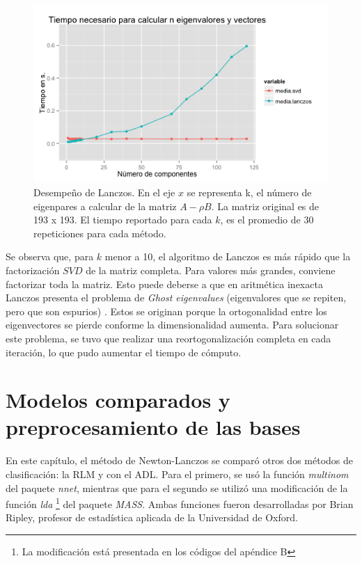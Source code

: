 \begin{figure}[!ht] \label{fig5.1}
  \centering
  \includegraphics[width=1\textwidth]{Figures/Chapter4_eigen_lanczos.png} 
  \caption[Desempeño de Lanczos.] {Desempeño de Lanczos. En el eje $x$ se representa k, el número de eigenpares a calcular de la matriz $A- \rho B$. La matriz original es de 193 x 193. El tiempo reportado para cada $k$, es el promedio de $30$ repeticiones para cada método.}
\end{figure}

Se observa que, para $k$ menor a 10, el algoritmo de Lanczos es más rápido que la factorización $SVD$ de la matriz completa. Para valores más grandes, conviene factorizar toda la matriz. Esto puede deberse a que en aritmética inexacta Lanczos presenta el problema de \textit{Ghost eigenvalues} (eigenvalores que se repiten, pero que son espurios) \cite{golub2012matrix}. Estos se originan porque la ortogonalidad entre los eigenvectores se pierde conforme la dimensionalidad aumenta. Para solucionar este problema, se tuvo que realizar una reortogonalización completa en cada iteración, lo que pudo aumentar el tiempo de cómputo. 

\section{Modelos comparados y preprocesamiento de las bases}

En este capítulo, el método de Newton-Lanczos se comparó otros dos métodos de clasificación: la RLM y con el ADL. Para el primero, se usó la función \textit{multinom} del paquete \textit{nnet}, mientras que para el segundo se utilizó una modificación de la función \textit{lda} \footnote{La modificación está presentada en los códigos del apéndice B} del paquete \textit{MASS}. Ambas funciones fueron desarrolladas por Brian Ripley, profesor de estadística aplicada de la Universidad de Oxford. 

